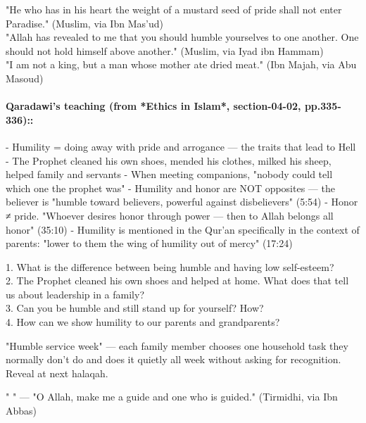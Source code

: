\documentclass[11pt,a4paper]{article}
\begin{document}
\begin{hadithbox} "He who has in his heart the weight of a mustard seed of pride shall not enter Paradise." (Muslim, via Ibn Mas'ud) \\ "Allah has revealed to me that you should humble yourselves to one another. One should not hold himself above another." (Muslim, via Iyad ibn Hammam) \\ "I am not a king, but a man whose mother ate dried meat." (Ibn Majah, via Abu Masoud) \end{hadithbox}

\paragraph*{Qaradawi's teaching (from *Ethics in Islam*, section-04-02, pp.335-336)::}  - Humility = doing away with pride and arrogance --- the traits that lead to Hell - The Prophet cleaned his own shoes, mended his clothes, milked his sheep, helped family and servants - When meeting companions, "nobody could tell which one the prophet was" - Humility and honor are NOT opposites --- the believer is "humble toward believers, powerful against disbelievers" (5:54) - Honor ≠ pride. "Whoever desires honor through power --- then to Allah belongs all honor" (35:10) - Humility is mentioned in the Qur'an specifically in the context of parents: "lower to them the wing of humility out of mercy" (17:24)

\begin{discussionbox} 1. What is the difference between being humble and having low self-esteem? \\ 2. The Prophet cleaned his own shoes and helped at home. What does that tell us about leadership in a family? \\ 3. Can you be humble and still stand up for yourself? How? \\ 4. How can we show humility to our parents and grandparents? \end{discussionbox}

\begin{activitybox} "Humble service week" --- each family member chooses one household task they normally don't do and does it quietly all week without asking for recognition. Reveal at next halaqah. \end{activitybox}

\begin{duabox} "   " --- "O Allah, make me a guide and one who is guided." (Tirmidhi, via Ibn Abbas) \end{duabox}
\end{document}
